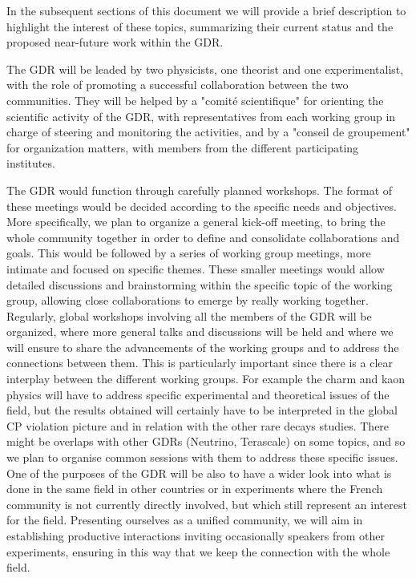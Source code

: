In the subsequent sections of this document we will provide a brief description to highlight  the interest of these  topics,  summarizing their  current status and the proposed near-future work within the GDR. 

The GDR will be leaded by two physicists, one theorist and one experimentalist, with the role of promoting a successful collaboration between the two communities. They will be helped by a "comit\'{e} scientifique"  for orienting the scientific activity of the GDR, with representatives from each working group in charge of steering and monitoring the activities,   and by a "conseil de groupement" for organization matters, with members from the different participating institutes.   
  
  The GDR would function through carefully planned workshops. The format of these meetings would be  decided according to the specific needs and objectives.  More specifically, we plan to organize a general kick-off meeting, to bring the whole community together in order to define and consolidate collaborations and goals.   This would be followed by a series of working group meetings, more intimate and focused on specific themes. These smaller meetings would allow detailed discussions and brainstorming within the specific topic of the working group, allowing close collaborations to emerge by really working together. Regularly, global workshops involving all the members of the GDR will be organized, where more general talks and discussions will be held and where we will ensure to share the advancements of the working groups and to address the connections between them. This is particularly important since there is a clear interplay  between the different working groups. For example the charm and kaon physics will have to address specific experimental and theoretical issues of the field, but the results obtained will certainly have to be interpreted in the global CP violation picture and in relation with the other rare decays studies.  There might be overlaps with other GDRs (Neutrino, Terascale) on some topics, and so we plan to organise common sessions with them to address these specific issues.  
One of the purposes of the GDR will be also to have a wider look into what is done in the same field in other countries or in experiments where the French community is not currently directly involved, but which still represent an interest for the field. Presenting ourselves as a unified community, we will aim in establishing productive interactions inviting occasionally speakers from other experiments, ensuring in this way that we keep the connection with the whole field. 

